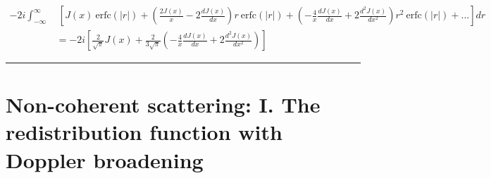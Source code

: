 \documentclass[onecolumn]{aastex63}
\begin{document}
\begin{equation}
    \begin{split}
       -2i\int_{-\infty}^{\infty}&\ \left[J(x)\ \mathrm{erfc}\left(|r|\right) + \left(\frac{2J(x)}{x} - 2\frac{dJ(x)}{dx}\right) r\ \mathrm{erfc}\left(|r|\right) + \left(-\frac{4}{x}\frac{dJ(x)}{dx} + 2\frac{d^2 J(x)}{dx^2}\right)r^2\ \mathrm{erfc}\left(|r|\right) + ...\right]dr \\
       &= -2i \left[\frac{2}{\sqrt{\pi}} J(x) + \frac{2}{3\sqrt{\pi}}\left(-\frac{4}{x}\frac{dJ(x)}{dx} + 2\frac{d^2 J(x)}{dx^2}\right)\right]
   \end{split}
\end{equation}



\vspace{1cm}
\hrule
\vspace{1cm}

\section{ Non-coherent scattering: I. The redistribution function with Doppler broadening}
\begin{centering}

\cite{hummer1962}

\end{centering}


\end{document}
